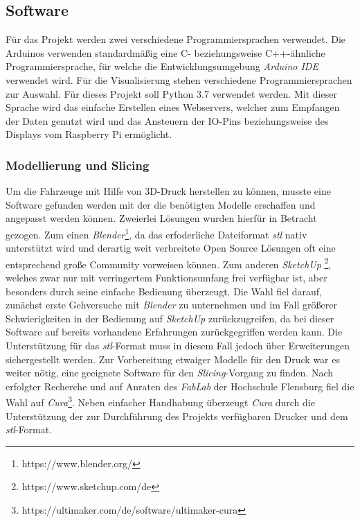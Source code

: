 \documentclass[.../Dokumentation.tex]{subfiles}
\begin{document}
\subsection{Software}\label{sec-components-software}
Für das Projekt werden zwei verschiedene Programmiersprachen verwendet. 
Die Arduinos verwenden standardmäßig eine C- beziehungsweise C++-ähnliche 
Programmiersprache, für welche die Entwicklungsumgebung 
\textit{Arduino IDE} verwendet wird. 
Für die Visualisierung stehen verschiedene Programmiersprachen zur Auswahl. 
Für dieses Projekt soll Python 3.7 verwendet werden. Mit dieser Sprache wird das einfache Erstellen eines Webservers, welcher zum Empfangen 
der Daten genutzt wird und das Ansteuern der IO-Pins beziehungsweise des 
Displays vom Raspberry Pi ermöglicht.

\subsubsection{Modellierung und Slicing}\label{sec-components-software-model}
Um die Fahrzeuge mit Hilfe von 3D-Druck herstellen zu können, musste eine 
Software gefunden werden mit der die benötigten Modelle erschaffen und angepasst 
werden können. Zweierlei Lösungen wurden hierfür in Betracht gezogen.
Zum einen \textit{Blender}\footnote{https://www.blender.org/},
da das erfoderliche Dateiformat 
\textit{stl} nativ unterstützt wird und derartig weit verbreitete Open 
Source Lösungen oft eine entsprechend große Community vorweisen können.
Zum anderen \textit{SketchUp} \footnote{https://www.sketchup.com/de},
welches zwar nur mit verringertem 
Funktionsumfang frei verfügbar ist, aber besonders durch seine einfache 
Bedienung überzeugt. Die Wahl fiel darauf, zunächst erste Gehversuche mit \textit{Blender} 
zu unternehmen und im Fall größerer Schwierigkeiten in der Bedienung auf 
\textit{SketchUp} zurückzugreifen, da bei dieser Software auf bereits 
vorhandene Erfahrungen zurückgegriffen werden kann. 
Die Unterstützung für das \textit{stl}-Format 
muss in diesem Fall jedoch über Erweiterungen sichergestellt werden. Zur Vorbereitung etwaiger Modelle für den Druck war es weiter nötig, 
eine geeignete Software für den \textit{Slicing}-Vorgang zu finden.
Nach erfolgter Recherche und auf Anraten des \textit{FabLab} der Hochschule 
Flensburg fiel die Wahl auf 
\textit{Cura}\footnote{https://ultimaker.com/de/software/ultimaker-cura}.
Neben einfacher Handhabung überzeugt \textit{Cura} durch die Unterstützung 
der zur Durchführung des Projekts verfügbaren Drucker und dem 
\textit{stl}-Format.
\end{document}
